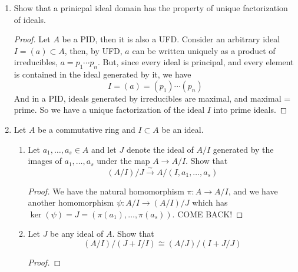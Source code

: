 \documentclass[hidelinks,12pt]{article}
\begin{document}
\begin{enumerate}
    \item Show that a prinicpal ideal domain has the property of unique factorization of ideals.
        \begin{proof}
            Let \(A\) be a PID, then it is also a UFD. Consider an arbitrary ideal \(I=(a)\subset A\), then, by UFD, \(a\) can be written uniquely as a product of irreducibles, \(a=p_{1}\cdots p_{n}\). But, since every ideal is principal, and every element is contained in the ideal generated by it, we have \[
                I=(a)=(p_{1})\cdots(p_{n})
            \]
            And in a PID, ideals generated by irreducibles are maximal, and maximal = prime. So we have a unique factorization of the ideal \(I\) into prime ideals. 
        \end{proof}
    \item Let \(A\) be a commutative ring and \(I\subset A\) be an ideal.
        \begin{enumerate}[label=(\alph*).]
            \item Let \(a_{1},\dots,a_{s}\in A\) and let \(J\) denote the ideal of \(A/I\) generated by the images of \(a_{1},\dots,a_{s}\) under the map \(A\to A/I\). Show that \[
                    (A/I)/J\overset{\sim}{\to} A/(I,a_{1},\dots,a_{s})
                \]
                \begin{proof}
                    We have the natural homomorphism \(\pi:A\to A/I\), and we have another homomorphism \(\psi:A/I\to (A/I)/J\) which has \(\ker(\psi)=J=(\pi(a_{1}),\dots,\pi(a_{s}))\). COME BACK!
                \end{proof}
            \item Let \(J\) be any ideal of \(A\). Show that \[
                    (A/I)/(J+I/I)\cong(A/J)/(I+J/J)
                \]
                \begin{proof}


\end{proof}
\end{enumerate}
\end{enumerate}
\end{document}
